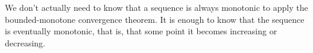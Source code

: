 \documentclass{ximera}
\begin{document}

\begin{remark}
We don't actually need to know that a sequence is always monotonic to apply
the bounded-monotone convergence theorem. It is enough to know that
the sequence is eventually monotonic, that is, that some point it
becomes increasing or decreasing.
\end{remark}

%
%
\end{document}
